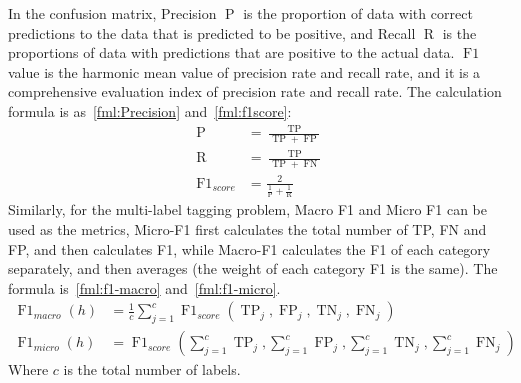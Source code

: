 In the confusion matrix, Precision \(\operatorname{P}\) is the proportion of data with correct predictions to the data that is predicted to be positive, and Recall \(\operatorname{R}\) is the proportions of data with predictions that are positive to the actual data. \(\operatorname{F1}\) value is the harmonic mean value of precision rate and recall rate, and it is a comprehensive evaluation index of precision rate and recall rate. The calculation formula is as~\ref{fml:Precision} and~\ref{fml:f1score}:
\begin{align}
	\operatorname{P}          & =\frac{\operatorname{TP}}{\operatorname{TP}+\operatorname{FP}} \label{fml:Precision}  \\
	\operatorname{R}          & =\frac{\operatorname{TP}}{\operatorname{TP}+\operatorname{FN}} \label{fml:Recall}     \\
	\operatorname{F1}_{score} & = \frac{2}{\frac{1}{\operatorname{P}}+\frac{1}{\operatorname{R}}} \label{fml:f1score}
\end{align}
Similarly, for the multi-label tagging problem, Macro F1 and Micro F1 can be used as the metrics, Micro-F1 first calculates the total number of TP, FN and FP, and then calculates F1, while Macro-F1 calculates the F1 of each category separately, and then averages (the weight of each category F1 is the same). The formula is~\ref{fml:f1-macro} and~\ref{fml:f1-micro}.
\begin{align}
	\operatorname{F1}_{macro}(h) & =\frac{1}{c} \sum_{j=1}^{c} \operatorname{F1}_{score}(\operatorname{TP}_{j}, \operatorname{FP}_{j}, \operatorname{TN}_{j}, \operatorname{FN}_{j}) \label{fml:f1-macro}                                  \\
	\operatorname{F1}_{micro}(h) & =\operatorname{F1}_{score}(\sum_{j=1}^{c} \operatorname{TP}_{j}, \sum_{j=1}^{c} \operatorname{FP}_{j}, \sum_{j=1}^{c} \operatorname{TN}_{j}, \sum_{j=1}^{c} \operatorname{FN}_{j}) \label{fml:f1-micro}
\end{align}
Where \(c\) is the total number of labels.

